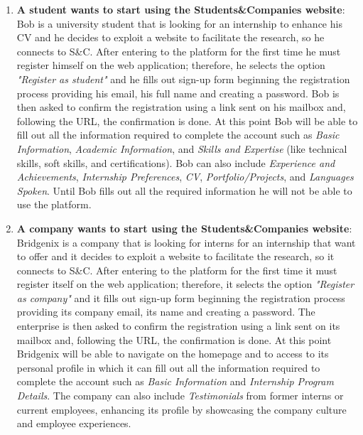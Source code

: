         \begin{enumerate}
            
            \item \textbf{A student wants to start using the Students\&Companies website}:
            \\Bob is a university student that is looking for an internship to enhance his CV and he decides to exploit a website to facilitate the research, so he connects to S\&C. After entering to the platform for the first time he must register himself on the web application; therefore, he selects the option \textit{"Register as student"} and he fills out sign-up form beginning the registration process providing his email, his full name and creating a password. Bob is then asked to confirm the registration using a link sent on his mailbox and, following the URL, the confirmation is done. At this point Bob will be able to fill out all the information required to complete the account such as \textit{Basic Information}, \textit{Academic Information}, and \textit{Skills and Expertise} (like technical skills, soft skills, and certifications). Bob can also include \textit{Experience and Achievements}, \textit{Internship Preferences}, \textit{CV}, \textit{Portfolio/Projects}, and \textit{Languages Spoken}. Until Bob fills out all the required information he will not be able to use the platform.

            \item \textbf{A company wants to start using the Students\&Companies website}:
            \\Bridgenix is a company that is looking for interns for an internship that want to offer and it decides to exploit a website to facilitate the research, so it connects to S\&C. After entering to the platform for the first time it must register itself on the web application; therefore, it selects the option \textit{"Register as company"} and it fills out sign-up form beginning the registration process providing its company email, its name and creating a password. The enterprise is then asked to confirm the registration using a link sent on its mailbox and, following the URL, the confirmation is done. At this point Bridgenix will be able to navigate on the homepage and to access to its personal profile in which it can fill out all the information required to complete the account such as \textit{Basic Information} and \textit{Internship Program Details}. The company can also include \textit{Testimonials} from former interns or current employees, enhancing its profile by showcasing the company culture and employee experiences.


\end{enumerate}
